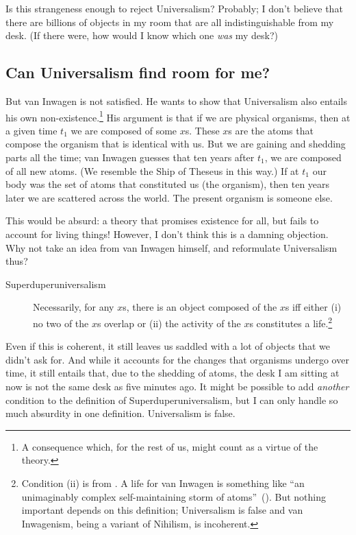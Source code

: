 Is this strangeness enough to reject Universalism? Probably; I don't believe that there are billions of objects in my room that are all indistinguishable from my desk. (If there were, how would I know which one {\em was} my desk?)

\subsection{Can Universalism find room for me?}
But van Inwagen is not satisfied. He wants to show that Universalism also entails his own non-existence.\footnote{A consequence which, for the rest of us, might count as a virtue of the theory.} His argument is that if we are physical organisms, then at a given time $t_{1}$ we are composed of some $x$s. These $x$s are the atoms that compose the organism that is identical with us. But we are gaining and shedding parts all the time; van Inwagen guesses that ten years after $t_{1}$, we are composed of all new atoms. (We resemble the Ship of Theseus in this way.) If at $t_{1}$ our body was the set of atoms that constituted us (the organism), then ten years later we are scattered across the world. The present organism is someone else.

This would be absurd: a theory that promises existence for all, but fails to account for living things! However, I don't think this is a damning objection. Why not take an idea from van Inwagen himself, and reformulate Universalism thus?
\begin{description}
	\item[Superduperuniversalism] Necessarily, for any $x$s, there is an object composed of the $x$s iff either (i) no two of the $x$s overlap or (ii) the activity of the $x$s constitutes a life.\footnote{Condition (ii) is from \citet[82]{inwagen1995}. A life for van Inwagen is something like ``an unimaginably complex self-maintaining storm of atoms''~(\citeyear[87]{inwagen1995}). But nothing important depends on this definition; Universalism is false and van Inwagenism, being a variant of Nihilism, is incoherent.}
\end{description}
Even if this is coherent, it still leaves us saddled with a lot of objects that we didn't ask for. And while it accounts for the changes that organisms undergo over time, it still entails that, due to the shedding of atoms, the desk I am sitting at now is not the same desk as five minutes ago. It might be possible to add {\em another} condition to the definition of Superduperuniversalism, but I can only handle so much absurdity in one definition. Universalism is false.

